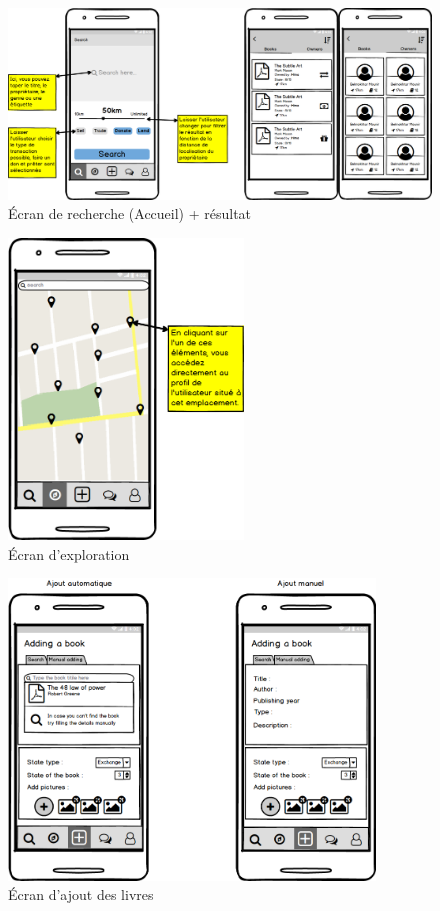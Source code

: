 \begin{figure}[H]
	\begin{center}
		\includegraphics[width=14cm]{Images/chapter3/wireframe/home.png}
		\caption{{\footnotesize Écran de recherche (Accueil) + résultat}}
	\end{center}
\end{figure}

\begin{figure}[H]
	\begin{center}
		\includegraphics[height=8cm]{Images/chapter3/wireframe/explore.png}
		\caption{{\footnotesize Écran d'exploration}}
	\end{center}
\end{figure}

\begin{figure}[H]
	\begin{center}
		\includegraphics[height=8cm]{Images/chapter3/wireframe/adding_a_book.png}
		\caption{{\footnotesize Écran d'ajout des livres}}
	\end{center}
\end{figure}

